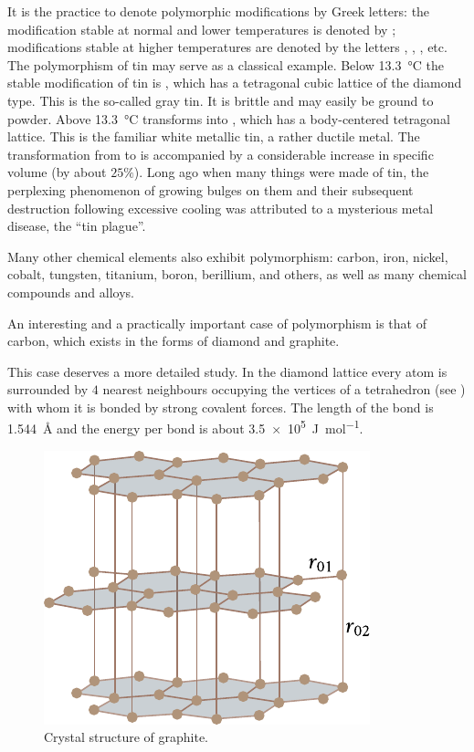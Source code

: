 It is the practice to denote polymorphic modifications by Greek letters: the modification stable at normal and lower temperatures is denoted by \ce{\alpha}; modifications stable at higher temperatures are denoted by the letters \ce{\beta}, \ce{\gamma}, \ce{\delta}, etc. The polymorphism of tin may serve as a classical example. Below \SI{13.3}{\degreeCelsius} the stable modification of tin is , which has a tetragonal cubic lattice of the diamond type. This is the so-called gray tin. It is brittle and may easily be ground to powder. Above \SI{13.3}{\degreeCelsius}  transforms into , which has a body-centered tetragonal lattice. This is the familiar white metallic tin, a rather ductile metal. The transformation from  to  is accompanied by a considerable increase in specific volume (by about $25\%$). Long ago when many things were made of tin, the perplexing phenomenon of growing bulges on them and their subsequent destruction following excessive cooling was attributed to a mysterious metal disease, the ``tin plague''.

Many other chemical elements also exhibit polymorphism: carbon, iron, nickel, cobalt, tungsten, titanium, boron, berillium, and others, as well as many chemical compounds and alloys.

An interesting and a practically important case of polymorphism is that of carbon, which exists in the forms of diamond and graphite.

This case deserves a more detailed study. In the diamond lattice every atom is surrounded by $4$ nearest neighbours occupying the vertices of a tetrahedron (see ) with whom it is bonded by strong covalent forces. The length of the bond is \SI{1.544}{\angstrom} and the energy per bond is about \SI{3.5e5}{\joule\per\mole}.

\begin{figure}[t]
	\begin{center}
		\includegraphics[scale=1.0]{figures/ch_01/fig_1_24.pdf}
		\caption[]{Crystal structure of graphite.}
		\label{fig:1_24}
	\end{center}
	\vspace{-0.7cm}
\end{figure}

